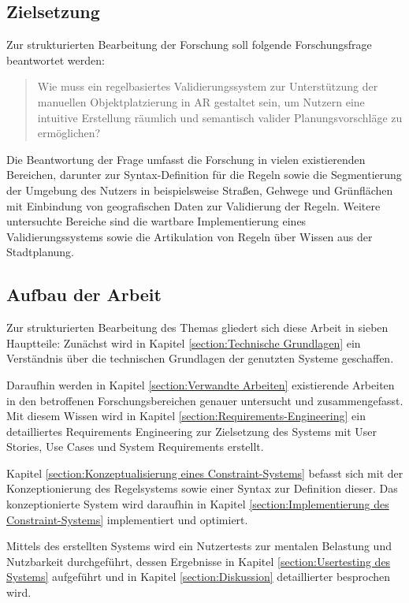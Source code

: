 \subsection{Zielsetzung}

Zur strukturierten Bearbeitung der Forschung soll folgende Forschungsfrage beantwortet werden:

\begin{quote}
Wie muss ein regelbasiertes Validierungssystem zur Unterstützung der manuellen Objektplatzierung in AR gestaltet sein, um Nutzern eine intuitive Erstellung räumlich und semantisch valider Planungsvorschläge zu ermöglichen?
\end{quote}

Die Beantwortung der Frage umfasst die Forschung in vielen existierenden Bereichen, darunter zur Syntax-Definition für die Regeln sowie die Segmentierung der Umgebung des Nutzers in beispielsweise Straßen, Gehwege und Grünflächen mit Einbindung von geografischen Daten zur Validierung der Regeln. Weitere untersuchte Bereiche sind die wartbare Implementierung eines Validierungssystems sowie die Artikulation von Regeln über Wissen aus der Stadtplanung.

\subsection{Aufbau der Arbeit}

Zur strukturierten Bearbeitung des Themas gliedert sich diese Arbeit in sieben Hauptteile: Zunächst wird in Kapitel \ref{section:Technische Grundlagen} ein Verständnis über die technischen Grundlagen der genutzten Systeme geschaffen.

Daraufhin werden in Kapitel \ref{section:Verwandte Arbeiten} existierende Arbeiten in den betroffenen Forschungsbereichen genauer untersucht und zusammengefasst. Mit diesem Wissen wird in Kapitel \ref{section:Requirements-Engineering} ein detailliertes Requirements Engineering zur Zielsetzung des Systems mit User Stories, Use Cases und System Requirements erstellt.

Kapitel \ref{section:Konzeptualisierung eines Constraint-Systems} befasst sich mit der Konzeptionierung des Regelsystems sowie einer Syntax zur Definition dieser. Das konzeptionierte System wird daraufhin in Kapitel \ref{section:Implementierung des Constraint-Systems} implementiert und optimiert.

Mittels des erstellten Systems wird ein Nutzertests zur mentalen Belastung und Nutzbarkeit durchgeführt, dessen Ergebnisse in Kapitel \ref{section:Usertesting des Systems} aufgeführt und in Kapitel \ref{section:Diskussion} detaillierter besprochen wird.

